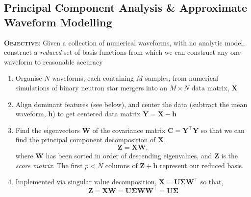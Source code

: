 \documentclass[a0,landscape]{a0poster}
\newcommand{\matr}[1]{\mathbf{#1}}
\newcommand{\tran}[1]{#1^{\top}}
\begin{document}
\begin{multicols}{4}

\section*{\centering Principal Component Analysis \& Approximate Waveform Modelling}

{\bf \textsc{Objective}}: Given a collection of numerical waveforms, with no analytic
model, construct a \emph{reduced} set of basis functions from which we can
construct any one waveform to reasonable accuracy

\begin{enumerate}
    \item Organise $N$ waveforms, each containing $M$ samples, from
        numerical simulations of binary neutron star mergers into an $M\times N$
        data matrix, $\matr{X}$
    \item Align dominant features (see below), and center the data (subtract the
        mean waveform, $\matr{h}$) to get centered data matrix
        $\matr{Y}=\matr{X}-\matr{h}$
    \item Find the eigenvectors $\matr{W}$ of the covariance matrix
        $\matr{C} = \tran{\matr{Y}}\matr{Y}$ so that we can find the principal component
        decomposition of $\matr{X}$,
        \begin{equation}\label{eq:pca}
            \matr{Z} = \matr{X} \matr{W},
        \end{equation}
        where $\matr{W}$ has been sorted in order of descending eigenvalues, and
        $\matr{Z}$ is the \emph{score matrix}.  The first $p<N$ columns of
        $\matr{Z}+\matr{h}$ represent our reduced basis.
    \item Implemented via singular value decomposition, $\matr{X} =
        \matr{U}\matr{\Sigma}\tran{\matr{W}}$ so that,
        \begin{equation}
            \matr{Z} = \matr{X} \matr{W} =
            \matr{U}\matr{\Sigma}\matr{W}\tran{\matr{W}} = \matr{U}\matr{\Sigma}
        \end{equation}
\end{enumerate}



\end{multicols}
\end{document}

